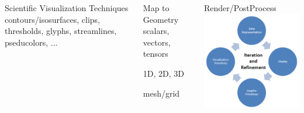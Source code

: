 \begin{frame}
\begin{small}
\begin{columns}
\begin{column}{3.85cm}
\begin{beamerboxesrounded}[upper=block head,lower=block body,shadow=true]{\textcolor{DarkRed}{} Scientific Visualization Techniques}
        \textcolor{DarkRed}{} contours/isosurfaces, clips, thresholds, glyphs, streamlines, pseducolors, ...
\end{beamerboxesrounded}
\end{column}
\begin{column}{3.85cm}
\begin{beamerboxesrounded}[upper=block head,lower=block body,shadow=true]{\textcolor{DarkRed}{} Map to Geometry}
        \textcolor{DarkRed}{} scalars, vectors, tensors

        \textcolor{DarkRed}{} 1D, 2D, 3D

        \textcolor{DarkRed}{} mesh/grid
\end{beamerboxesrounded}
\end{column}
\begin{column}{3.85cm}
\begin{beamerboxesrounded}[upper=block head,lower=block body,shadow=true]{\textcolor{DarkRed}{} Render/PostProcess}
        \centering
        \includegraphics[width=.75\columnwidth]{figs/viz/render}
\end{beamerboxesrounded}
\end{column}
\end{columns}
\end{small}
\end{frame}

